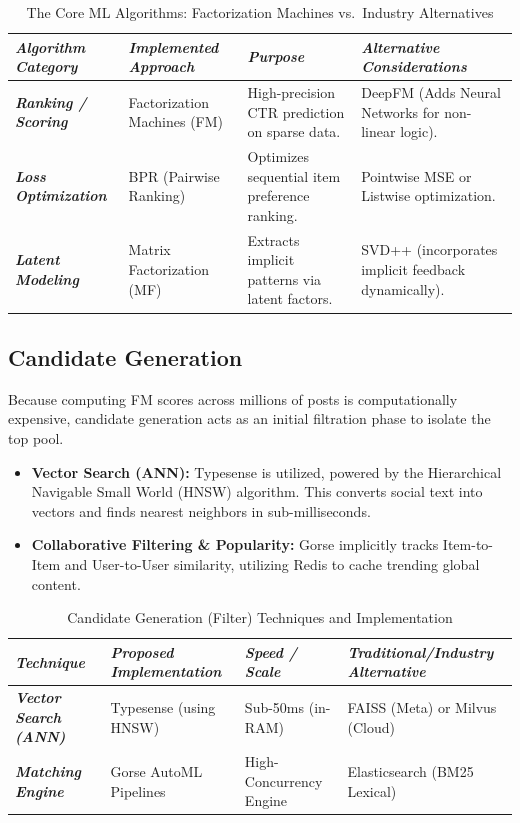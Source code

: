 \begin{table}[htbp]
\centering
\caption{The Core ML Algorithms: Factorization Machines vs.\ Industry Alternatives}
\label{tab:core-ml}
\begin{tabularx}{\textwidth}{XXXX}
\toprule
\textbf{\textit{Algorithm Category}} & \textbf{\textit{Implemented Approach}} & \textbf{\textit{Purpose}} & \textbf{\textit{Alternative Considerations}} \\
\midrule
\textbf{\textit{Ranking / Scoring}} & Factorization Machines (FM) & High-precision CTR prediction on sparse data. & DeepFM (Adds Neural Networks for non-linear logic). \\
\rowcolor{gray!10}
\textbf{\textit{Loss Optimization}} & BPR (Pairwise Ranking) & Optimizes sequential item preference ranking. & Pointwise MSE or Listwise optimization. \\
\textbf{\textit{Latent Modeling}} & Matrix Factorization (MF) & Extracts implicit patterns via latent factors. & SVD++ (incorporates implicit feedback dynamically). \\
\bottomrule
\end{tabularx}
\end{table}

\subsection{Candidate Generation}
Because computing FM scores across millions of posts is computationally expensive, candidate generation acts as an initial filtration phase to isolate the top pool.
\begin{itemize}
    \item \textbf{Vector Search (ANN):} Typesense is utilized, powered by the Hierarchical Navigable Small World (HNSW) algorithm. This converts social text into vectors and finds nearest neighbors in sub-milliseconds.
    \item \textbf{Collaborative Filtering \& Popularity:} Gorse implicitly tracks Item-to-Item and User-to-User similarity, utilizing Redis to cache trending global content.
\end{itemize}

\begin{table}[htbp]
\centering
\caption{Candidate Generation (Filter) Techniques and Implementation}
\label{tab:candidate-gen}
\begin{tabularx}{\textwidth}{XXXX}
\toprule
\textbf{\textit{Technique}} & \textbf{\textit{Proposed Implementation}} & \textbf{\textit{Speed / Scale}} & \textbf{\textit{Traditional/Industry Alternative}} \\
\midrule
\textbf{\textit{Vector Search (ANN)}} & Typesense (using HNSW) & Sub-50ms (in-RAM) & FAISS (Meta) or Milvus (Cloud) \\
\rowcolor{gray!10}
\textbf{\textit{Matching Engine}} & Gorse AutoML Pipelines & High-Concurrency Engine & Elasticsearch (BM25 Lexical) \\
\bottomrule
\end{tabularx}
\end{table}

